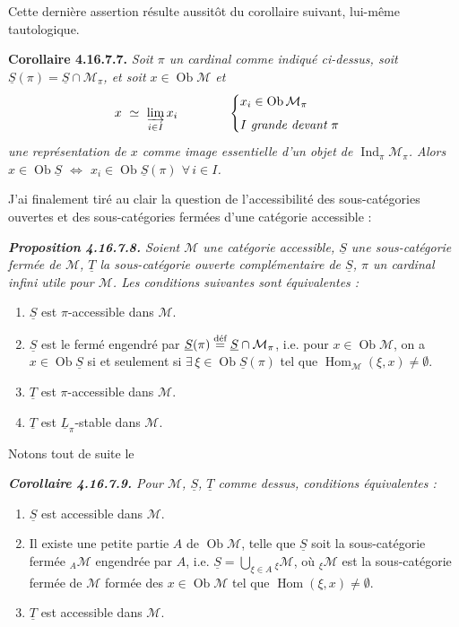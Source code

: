 \documentclass[11pt]{article}
\newcommand{\msp}[1]{\marginpar{\footnotesize [#1]}}
\newcommand{\cM}{\mathcal{M}}
\newcommand{\Ob}{\operatorname{Ob}}
\newcommand{\Hom}{\operatorname{Hom}}
\newcommand{\Ind}{\operatorname{Ind}}
\newcommand{\uS}{\underline{S}}
\newcommand{\uT}{\underline{T}}
\begin{document}
Cette dernière assertion résulte aussitôt du corollaire suivant, lui-même tautologique.

\textbf{Corollaire 4.16.7.7.} \textit{Soit $\pi$ un cardinal comme indiqué ci-dessus, soit $\uS(\pi) = \uS \cap \cM_\pi$, et soit $x \in \Ob \cM$ et
\[
x \ \simeq\ \varinjlim_{i\in I} x_i \qquad\qquad
\begin{cases}
x_i \in \Ob \cM_\pi \\[1ex]
I \ \textit{grande devant}\ \pi
\end{cases}
\]
une représentation de $x$ comme image essentielle d'un objet de $\Ind_\pi \cM_\pi$. Alors $x \in \Ob \uS$ $\Longleftrightarrow$ $x_i \in \Ob \uS(\pi)$ $\forall\, i \in I$.}

\msp{page 487}
J'ai finalement tiré au clair la question de l'accessibilité des sous-catégories ouvertes et des sous-catégories fermées d'une catégorie accessible :

\begingroup\itshape
\noindent\textbf{\upshape Proposition 4.16.7.8.} Soient $\cM$ une catégorie accessible, $\uS$ une sous-catégorie fermée de $\cM$, $\uT$ la sous-catégorie ouverte complémentaire de $\uS$, $\pi$ un cardinal infini utile pour $\cM$. Les conditions suivantes sont équivalentes :
\begin{enumerate}[label={}]
\item[a)] $\uS$ est $\pi$-accessible dans $\cM$.
\item[a$'$)] $\uS$ est le fermé engendré par $\uS(\pi) \overset{\text{\upshape déf}}{=} \uS \cap \cM_\pi$, i.e. pour $x \in \Ob \cM$, on a $x \in \Ob \uS$ si et seulement si $\exists\, \xi \in \Ob \uS(\pi)$ tel que $\Hom_{\cM}(\xi, x) \neq \emptyset$.
\item[b)] $\uT$ est $\pi$-accessible dans $\cM$.
\item[b$'$)] $\uT$ est $\underline{L}_\pi$-stable dans $\cM$.
\end{enumerate}
\endgroup

\noindent Notons tout de suite le

\begingroup\itshape
\noindent\textbf{\upshape Corollaire 4.16.7.9.} Pour $\cM$, $\uS$, $\uT$ comme dessus, conditions équivalentes :
\begin{enumerate}[label={}]
\item[a)] $\uS$ est accessible dans $\cM$.
\item[a$'$)] Il existe une \textup{petite} partie $A$ de $\Ob \cM$, telle que $\uS$ soit la sous-catégorie fermée ${}_A\cM$ engendrée par $A$, i.e. $\uS = \bigcup_{\xi\in A} {}_\xi\cM$, où ${}_\xi\cM$ est la sous-catégorie fermée de $\cM$ formée des $x \in \Ob \cM$ tel que $\Hom(\xi, x) \neq \emptyset$.
\item[b)] \msp{page 488}$\uT$ est accessible dans $\cM$.
\end{enumerate}
\endgroup
\end{document}
